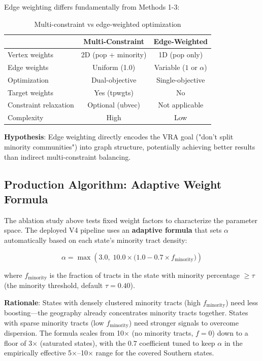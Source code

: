 Edge weighting differs fundamentally from Methods 1-3:

\begin{table}[h]
\centering
\small
\begin{tabular}{lcc}
\toprule
& Multi-Constraint & Edge-Weighted \\
\midrule
Vertex weights & 2D (pop + minority) & 1D (pop only) \\
Edge weights & Uniform (1.0) & Variable ($1$ or $\alpha$) \\
Optimization & Dual-objective & Single-objective \\
Target weights & Yes (tpwgts) & No \\
Constraint relaxation & Optional (ubvec) & Not applicable \\
Complexity & High & Low \\
\bottomrule
\end{tabular}
\caption{Multi-constraint vs edge-weighted optimization}
\label{tab:method_comparison}
\end{table}

\textbf{Hypothesis}: Edge weighting directly encodes the VRA goal ("don't split minority communities") into graph structure, potentially achieving better results than indirect multi-constraint balancing.

\subsection{Production Algorithm: Adaptive Weight Formula}
\label{sec:adaptive_formula}

The ablation study above tests fixed weight factors to characterize the parameter space. The deployed V4 pipeline uses an \textbf{adaptive formula} that sets $\alpha$ automatically based on each state's minority tract density:

\begin{equation}
\alpha = \max\!\left(3.0,\; 10.0 \times \bigl(1.0 - 0.7 \times f_{\text{minority}}\bigr)\right)
\label{eq:adaptive_boost}
\end{equation}

where $f_{\text{minority}}$ is the fraction of tracts in the state with minority percentage $\geq \tau$ (the minority threshold, default $\tau = 0.40$).

\textbf{Rationale}: States with densely clustered minority tracts (high $f_{\text{minority}}$) need less boosting---the geography already concentrates minority tracts together. States with sparse minority tracts (low $f_{\text{minority}}$) need stronger signals to overcome dispersion. The formula scales from 10$\times$ (no minority tracts, $f = 0$) down to a floor of 3$\times$ (saturated states), with the $0.7$ coefficient tuned to keep $\alpha$ in the empirically effective 5$\times$--10$\times$ range for the covered Southern states.

